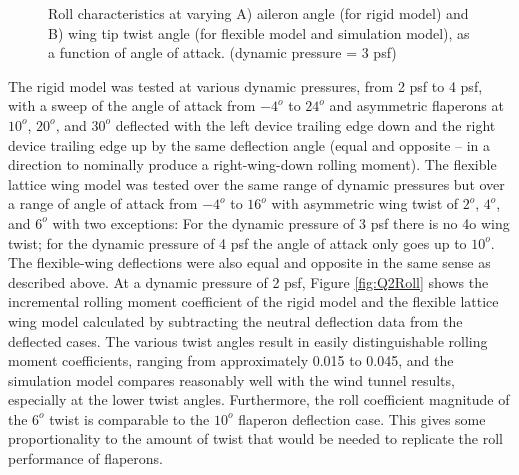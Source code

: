 \documentclass[11pt]{ucthesis}
\begin{document}
\begin{figure}
\hfill
{}
\hfill
{}
\hfill
\caption{Roll characteristics at varying A) aileron angle (for rigid model) and B) wing tip twist angle (for flexible model and simulation model), as a function of angle of attack. (dynamic pressure = 3 psf)}
\label{fig:Q3Roll}
\end{figure}

The rigid model was tested at various dynamic pressures, from 2 psf to 4 psf, with a sweep of the angle of attack from $−4^o$ to $24^o$ and asymmetric flaperons at $10^o$, $20^o$, and $30^o$ deflected with the left device trailing edge down and the right device trailing edge up by the same deflection angle (equal and opposite – in a direction to nominally produce a right-wing-down rolling moment).  The flexible lattice wing model was tested over the same range of dynamic pressures but over a range of angle of attack from $−4^o$ to $16^o$ with asymmetric wing twist of $2^o$, $4^o$, and $6^o$ with two exceptions:  For the dynamic pressure of 3 psf there is no 4o wing twist; for the dynamic pressure of 4 psf the angle of attack only goes up to $10^o$.  The flexible-wing deflections were also equal and opposite in the same sense as described above.  At a dynamic pressure of 2 psf, Figure \ref{fig:Q2Roll} shows the incremental rolling moment coefficient of the rigid model and the flexible lattice wing model calculated by subtracting the neutral deflection data from the deflected cases. The various twist angles result in easily distinguishable rolling moment coefficients, ranging from approximately 0.015 to 0.045, and the simulation model compares reasonably well with the wind tunnel results, especially at the lower twist angles. Furthermore, the roll coefficient magnitude of the $6^o$ twist is comparable to the $10^o$ flaperon deflection case. This gives some proportionality to the amount of twist that would be needed to replicate the roll performance of flaperons.
\end{document}
